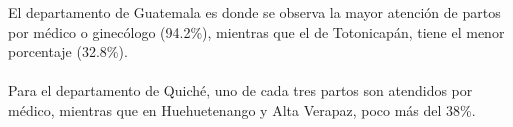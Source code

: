  El departamento de Guatemala  es donde se observa la mayor atención de partos por médico o ginecólogo (94.2\%), mientras que  el de Totonicapán, tiene el menor porcentaje (32.8\%).\\\\ 
Para el departamento de Quiché, uno de cada tres partos son atendidos por médico, mientras que en Huehuetenango y Alta Verapaz, poco más del 38\%.